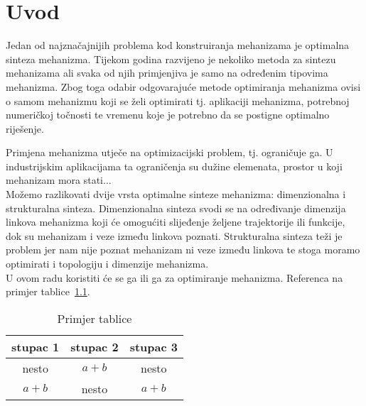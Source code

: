 \chapter{Uvod}
Jedan od najznačajnijih problema kod konstruiranja mehanizama je optimalna sinteza mehanizma.
Tijekom godina razvijeno je nekoliko metoda za sintezu mehanizama \cite{Chiang2000, Hansen2009} ali svaka od njih primjenjiva je samo na određenim tipovima mehanizma. 
Zbog toga odabir odgovarajuće metode optimiranja mehanizma ovisi o samom mehanizmu koji se želi optimirati tj. aplikaciji mehanizma, potrebnoj numeričkoj točnosti te vremenu koje je potrebno da se postigne optimalno riješenje.

Primjena mehanizma utječe na optimizacijski problem, tj. ograničuje ga. U industrijskim aplikacijama ta ograničenja su dužine elemenata, prostor u koji mehanizam mora stati...\\

Možemo razlikovati dvije vrsta optimalne sinteze mehanizma: dimenzionalna i strukturalna sinteza. 
Dimenzionalna sinteza svodi se na određivanje dimenzija linkova mehanizma koji će omogućiti slijeđenje željene trajektorije ili funkcije, dok su mehanizam i veze između linkova poznati.
Strukturalna sinteza teži je problem jer nam nije poznat mehanizam ni veze između linkova te stoga moramo optimirati i topologiju i dimenzije mehanizma.\\

U ovom radu koristiti će se \acrlong{ga} ili \acrshort{ga} \cite{McCall2005, Cabrera2002} za optimiranje mehanizma.
Referenca na primjer tablice~\ref{tbl:primjer}.


\begin{table}[h!]
\centering
\caption{Primjer tablice}
\label{tbl:primjer}
\begin{tabular}{ccc}
stupac 1 & stupac 2 & stupac 3\\
\hline
\hline
nesto & $a+b$ & nesto\\
$a+b$ & nesto & $a+b$\\
\hline
\end{tabular}
\end{table}